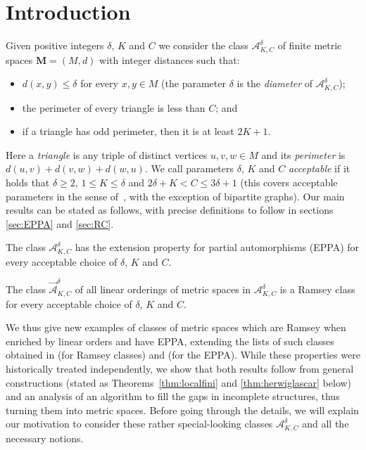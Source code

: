 \documentclass[11pt]{amsart}
\def\str#1{\mathbf {#1}}
\begin{document}
\section{Introduction}
Given positive integers $\delta$, $K$ and $C$ we consider the class
$\mathcal A^\delta_{K,C}$ of finite metric spaces $\str{M}=(M,d)$ with integer
distances such that:
\begin{itemize}
 \item $d(x,y)\leq \delta$ for every $x,y\in M$ (the parameter $\delta$ is the {\em diameter} of $\mathcal A^\delta_{K,C}$);
 \item the perimeter of every triangle is less than $C$; and
 \item if a triangle has odd perimeter, then it is at least $2K+1$.
\end{itemize}
Here a {\em triangle} is any triple of distinct vertices $u,v,w\in M$ and its {\em perimeter} is $d(u,v)+d(v,w)+d(w,u)$.
We call parameters $\delta$, $K$ and $C$ {\em acceptable} if it
holds that $\delta\geq 2$, $1\leq K\leq \delta$ and $2\delta+K<C\leq 3\delta+1$
(this covers acceptable parameters in the sense of~\cite{Cherlin2013}, with the exception
of bipartite graphs).
Our main results can be stated as follows, with precise definitions to follow in sections \ref{sec:EPPA} and \ref{sec:RC}.
\begin{theorem}
\label{thm:EPPA}
The class $\mathcal A^\delta_{K,C}$ has the extension property for partial automorphisms (EPPA) for every acceptable choice of $\delta$, $K$ and $C$.
\end{theorem}
\begin{theorem}
\label{thm:ramsey}
The class $\overrightarrow{\mathcal A}^\delta_{K,C}$ of all linear orderings of metric spaces in $\mathcal A^\delta_{K,C}$ is a Ramsey class for every acceptable choice of $\delta$, $K$ and $C$.
\end{theorem}
We thus give new examples of classes of metric spaces which are Ramsey when enriched by linear orders and have EPPA, extending the lists of such classes obtained in
\cite{Nevsetvril2007,The2010,Hubicka2016}
 (for Ramsey classes) and
 \cite{Solecki2005,vershik2008,Conant2015}
 (for the EPPA). While these properties were historically treated independently, we show that both results follow from general constructions (stated as Theorems~\ref{thm:localfini} and \ref{thm:herwiglascar} below) and an analysis of an algorithm to fill the gaps in incomplete structures, thus turning them into metric spaces. Before going through the details, we will explain our motivation to consider these rather special-looking classes $\mathcal A^\delta_{K,C}$ and all the necessary notions.
\end{document}
